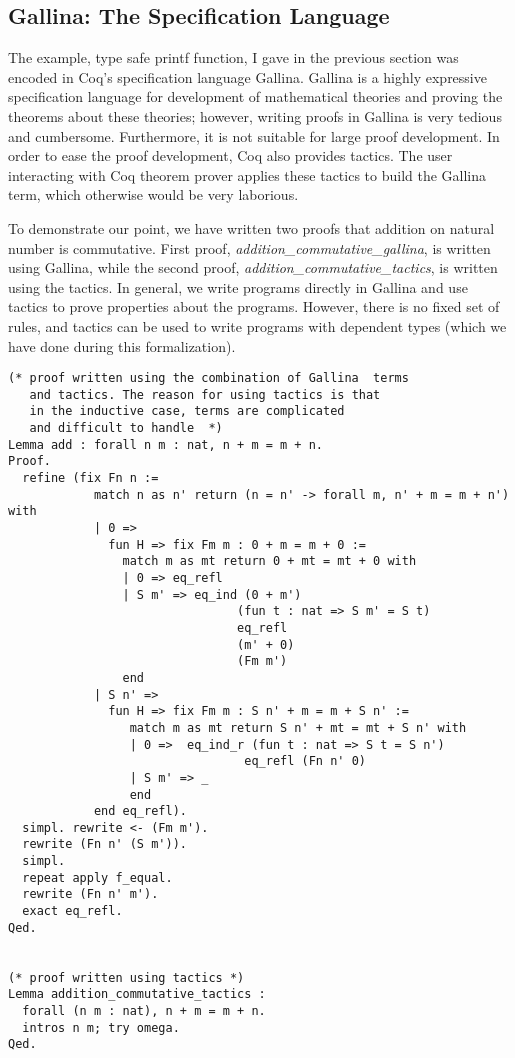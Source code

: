   
  

 
 \subsection{Gallina: The Specification Language}
 \label{sec:gallina}
  The example, type safe printf function, I gave in the previous 
  section was encoded in Coq's specification language Gallina. 
  Gallina is a highly expressive specification 
  language for development of mathematical theories and proving the    
  theorems about these  theories; however, writing proofs in Gallina
  is very tedious and cumbersome. Furthermore,  it is not suitable for large proof 
  development. In order to ease the proof development, Coq also provides 
  tactics.  The user interacting with Coq theorem prover applies these 
  tactics to build the  Gallina term,  which otherwise would  
  be very laborious.
  
 To demonstrate our point, we have written two proofs that addition on natural number is commutative. 
 First proof, \textit{addition\_commutative\_gallina}, is written using 
 Gallina, while the second proof, \textit{addition\_commutative\_tactics}, is written 
 using the tactics.  In general, we write programs directly in Gallina and use tactics 
 to prove properties about the programs. However, there is no fixed set of rules, and tactics 
 can be used to write programs with dependent types (which we have done during this
 formalization).
 
\begin{verbatim}
(* proof written using the combination of Gallina  terms 
   and tactics. The reason for using tactics is that  
   in the inductive case, terms are complicated 
   and difficult to handle  *)
Lemma add : forall n m : nat, n + m = m + n.
Proof.
  refine (fix Fn n :=
            match n as n' return (n = n' -> forall m, n' + m = m + n') with
            | 0 =>
              fun H => fix Fm m : 0 + m = m + 0 :=
                match m as mt return 0 + mt = mt + 0 with
                | 0 => eq_refl
                | S m' => eq_ind (0 + m')
                                (fun t : nat => S m' = S t)
                                eq_refl
                                (m' + 0)
                                (Fm m')
                end                  
            | S n' =>
              fun H => fix Fm m : S n' + m = m + S n' :=
                 match m as mt return S n' + mt = mt + S n' with
                 | 0 =>  eq_ind_r (fun t : nat => S t = S n')
                                 eq_refl (Fn n' 0)
                 | S m' => _
                 end                
            end eq_refl).
  simpl. rewrite <- (Fm m').
  rewrite (Fn n' (S m')).
  simpl.
  repeat apply f_equal.
  rewrite (Fn n' m').
  exact eq_refl.
Qed.


(* proof written using tactics *)
Lemma addition_commutative_tactics :
  forall (n m : nat), n + m = m + n.
  intros n m; try omega.
Qed.
\end{verbatim}



